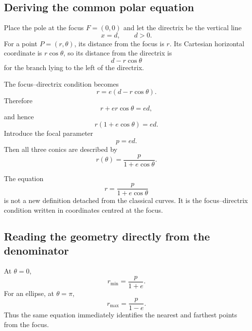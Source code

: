 \subsection{Deriving the common polar equation}

Place the pole at the focus $F=(0,0)$ and let the directrix be the vertical line
\[
x=d,
\qquad d>0.
\]
For a point $P=(r,\theta)$, its distance from the focus is $r$. Its Cartesian
horizontal coordinate is $r\cos\theta$, so its distance from the directrix is
\[
d-r\cos\theta
\]
for the branch lying to the left of the directrix.

The focus--directrix condition becomes
\[
r=e(d-r\cos\theta).
\]
Therefore
\[
r+er\cos\theta=ed,
\]
and hence
\[
\boxed{r(1+e\cos\theta)=ed}.
\]
Introduce the focal parameter
\[
\boxed{p=ed}.
\]
Then all three conics are described by
\[
\boxed{r(\theta)=\frac{p}{1+e\cos\theta}}.
\]

\begin{center}
\end{center}

\begin{corebox}
The equation
\[
r=\frac{p}{1+e\cos\theta}
\]
is not a new definition detached from the classical curves. It is the
focus--directrix condition written in coordinates centred at the focus.
\end{corebox}

\subsection{Reading the geometry directly from the denominator}

At $\theta=0$,
\[
\boxed{r_{\min}=\frac{p}{1+e}}.
\]
For an ellipse, at $\theta=\pi$,
\[
\boxed{r_{\max}=\frac{p}{1-e}}.
\]
Thus the same equation immediately identifies the nearest and farthest points
from the focus.

